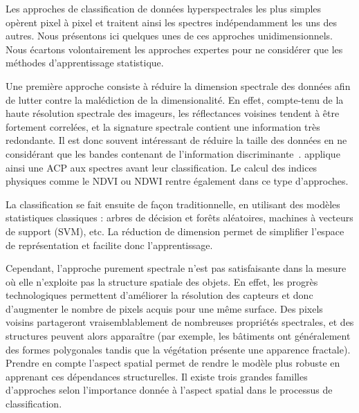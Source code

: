 Les approches de classification de données hyperspectrales les plus simples opèrent pixel à pixel et traitent ainsi les spectres indépendamment les uns des autres. Nous présentons ici quelques unes de ces approches unidimensionnels. Nous écartons volontairement les approches expertes pour ne considérer que les méthodes d'apprentissage statistique.

Une première approche consiste à réduire la dimension spectrale des données afin de lutter contre la malédiction de la dimensionalité. En effet, compte-tenu de la haute résolution spectrale des imageurs, les réflectances voisines tendent à être fortement correlées, et la signature spectrale contient une information très redondante. Il est donc souvent intéressant de réduire la taille des données en ne considérant que les bandes contenant de l'information discriminante~\cite{le_bris_extraction_2015,bevilacqua_unsupervised_2017}. \citet{rodarmel_principal_2002} applique ainsi une \gls{ACP} aux spectres avant leur classification. Le calcul des indices physiques comme le \gls{NDVI} ou \gls{NDWI} rentre également dans ce type d'approches.

La classification se fait ensuite de façon traditionnelle, en utilisant des modèles statistiques classiques : arbres de décision et forêts aléatoires, machines à vecteurs de support (SVM), etc. La réduction de dimension permet de simplifier l'espace de représentation et facilite donc l'apprentissage.

Cependant, l'approche purement spectrale n'est pas satisfaisante dans la mesure où elle n'exploite pas la structure spatiale des objets. En effet, les progrès technologiques permettent d'améliorer la résolution des capteurs et donc d'augmenter le nombre de pixels acquis pour une même surface. Des pixels voisins partageront vraisemblablement de nombreuses propriétés spectrales, et des structures peuvent alors apparaître (par exemple, les bâtiments ont généralement des formes polygonales tandis que la végétation présente une apparence fractale). Prendre en compte l'aspect spatial permet de rendre le modèle plus robuste en apprenant ces dépendances structurelles. Il existe trois grandes familles d'approches selon l'importance donnée à l'aspect spatial dans le processus de classification.

